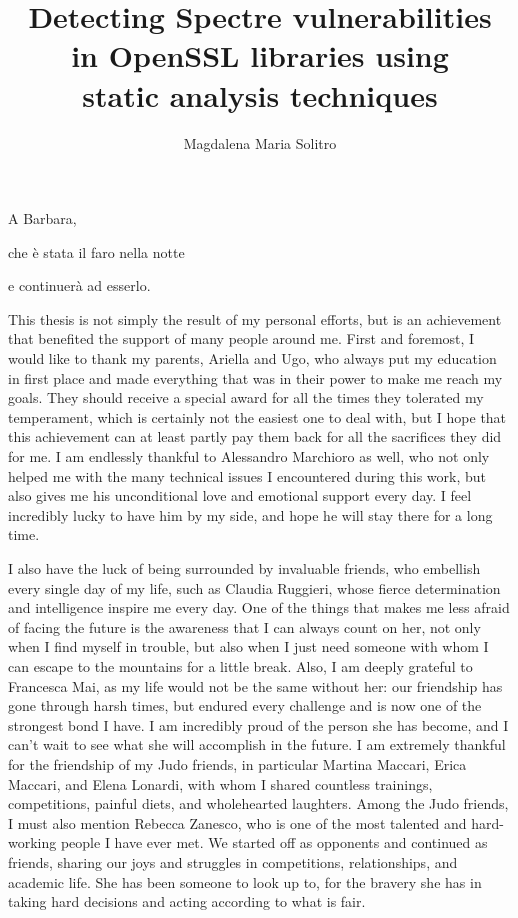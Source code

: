 \documentclass[target=mst,aauheader=aics]{thud}
\title{Detecting Spectre vulnerabilities \\in OpenSSL libraries using\\ static analysis techniques}
\author{Magdalena Maria Solitro}
\theoremstyle{definition}
\begin{document}
	\maketitle
	
	\begin{dedication}
		A Barbara,\par che è stata il faro nella notte \par e continuerà ad esserlo.
	\end{dedication}
	
	\acknowledgements
	This thesis is not simply the result of my personal efforts, but is an achievement that benefited the support of many people around me. First and foremost, I would like to thank my parents, Ariella and Ugo, who always put my education in first place and made everything that was in their power to make me reach my goals. They should receive a special award for all the times they tolerated my temperament, which is certainly not the easiest one to deal with, but I hope that this achievement can at least partly pay them back for all the sacrifices they did for me. I am endlessly thankful to Alessandro Marchioro as well, who not only helped me with the many technical issues I encountered during this work, but also gives me his unconditional love and emotional support every day. I feel incredibly lucky to have him by my side, and hope he will stay there for a long time. 
	
	I also have the luck of being surrounded by invaluable friends, who embellish every single day of my life, such as Claudia Ruggieri, whose fierce determination and intelligence inspire me every day. One of the things that makes me less afraid of facing the future is the awareness that I can always count on her, not only when I find myself in trouble, but also when I just need someone with whom I can escape to the mountains for a little break.
	Also, I am deeply grateful to Francesca Mai, as my life would not be the same without her: our friendship has gone through harsh times, but endured every challenge and is now one of the strongest bond I have. I am incredibly proud of the person she has become, and I can't wait to see what she will accomplish in the future. I am extremely thankful for the friendship of my Judo friends, in particular Martina Maccari, Erica Maccari, and Elena Lonardi, with whom I shared countless trainings, competitions, painful diets, and wholehearted laughters. Among the Judo friends, I must also mention Rebecca Zanesco, who is one of the most talented and hard-working people I have ever met. We started off as opponents and continued as friends, sharing our joys and struggles in competitions, relationships, and academic life. She has been someone to look up to, for the bravery she has in taking hard decisions and acting according to what is fair. 
	
\end{document}
